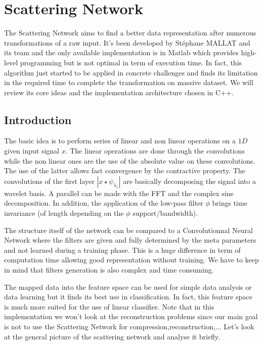 \documentclass[a4paper]{report}
\begin{document}
\chapter{Scattering Network}


The Scattering Network aims to find a better data representation after numerous transformations of a raw input. It's been developed by St\'ephane MALLAT and its team and the only available implementation is in Matlab which provides high-level programming but is not optimal in term of execution time. 
In fact, this algorithm just started to be applied in concrete challenges and finds its limitation in the required time to complete the transformation on massive dataset. We will review its core ideas and the implementation architecture chosen in C++.

\section{Introduction}\label{conv}


The basic idea is to perform series of linear and non linear operations on a $1D$ given input signal $x$. The linear operations are done through the convolutions while the non linear ones are the use of the absolute value on these convolutions. The use of the latter allows fast convergence by the contractive property. The convolutions of the first layer $|x \star \psi_{\lambda_1}|$ are basically decomposing the signal into a wavelet basis. A parallel can be made with the FFT and the complex sine decomposition. In addition, the application of the low-pass filter $\phi$ brings time invariance (of length depending on the $\phi$ support/bandwidth).


The structure itself of the network can be compared to a Convolutionnal Neural Network where the filters are given and fully determined by the meta parameters and not learned during a training phase. This is a huge difference in term of computation time allowing good representation without training. We have to keep in mind that filters generation is also complex and time consuming.


The mapped data into the feature space can be used for simple data analysis or data learning but it finds its best use in classification. In fact, this feature space is much more suited for the use of linear classifier.
Note that in this implementation we won't look at the reconstruction problems since our main goal is not to use the Scattering Network for compression,reconstruction,...
Let's look at the general picture of the scattering network and analyse it briefly.
\\
\end{document}
